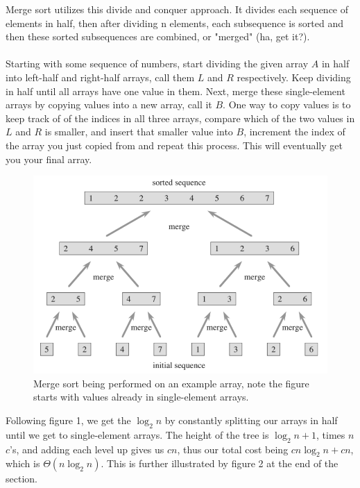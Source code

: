 \documentclass{article}
\begin{document}
Merge sort utilizes this divide and conquer approach. It divides each sequence of elements in half, then after dividing n elements, each subsequence is sorted and then these sorted subsequences are combined, or "merged" (ha, get it?).
\\
\\
Starting with some sequence of numbers, start dividing the given array $A$ in half into left-half and right-half arrays, call them $L$ and $R$ respectively. Keep dividing in half until all arrays have one value in them. Next, merge these single-element arrays by copying values into a new array, call it $B$. One way to copy values is to keep track of of the indices in all three arrays, compare which of the two values in $L$ and $R$ is smaller, and insert that smaller value into $B$, increment the index of the array you just copied from and repeat this process. This will eventually get you your final array.
\newpage
\begin{figure}[ht]
\centering
\includegraphics[scale=0.5]{merge}
\caption{
Merge sort being performed on an example array, note the figure starts with values already in single-element arrays.
}
\label{fig:merge_sort}
\end{figure}

Following figure 1, we get the $\log_2{n}$ by constantly splitting our arrays in half until we get to single-element arrays. The height of the tree is $\log_2{n} + 1$, times $n$ $c$'s, and adding each level up gives us $cn$, thus our total cost being $cn \log_2{n} + cn$, which is $\Theta{(n \log_2 n)}$. This is further illustrated by figure 2 at the end of the section.

\newpage
\end{document}
